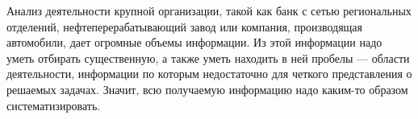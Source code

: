 Анализ деятельности крупной организации, такой как банк с сетью региональных отделений, нефтеперерабатывающий завод или компания, производящая автомобили, дает огромные объемы информации. Из этой информации надо уметь отбирать существенную, а также уметь находить в ней пробелы — области деятельности, информации по которым недостаточно для четкого представления о решаемых задачах. Значит, всю получаемую информацию надо каким-то образом систематизировать.



